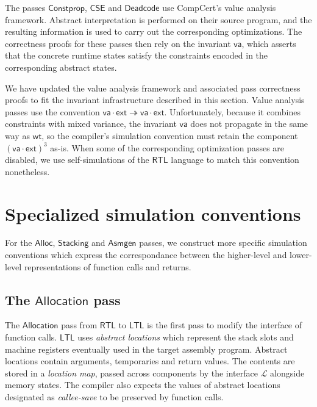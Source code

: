 \documentclass[acmsmall,screen,review,anonymous]{acmart}
\newcommand{\kw}[1]{\ensuremath{ \mathsf{#1} }}
\begin{document}
The passes
$\kw{Constprop}$, $\kw{CSE}$ and $\kw{Deadcode}$
use CompCert's value analysis framework.
Abstract interpretation is performed %
on their source program,
and the resulting information is used to carry out
the corresponding optimizations.
The correctness proofs for these passes then rely
on the invariant $\kw{va}$,
which asserts that the concrete runtime states
satisfy the constraints encoded in the corresponding
abstract states.

We have updated the value analysis framework
and associated pass correctness proofs
to fit the invariant infrastructure described in this section.
Value analysis passes use the convention
$\kw{va} \cdot \kw{ext} \twoheadrightarrow \kw{va} \cdot \kw{ext}$.
Unfortunately,
because it combines constraints with mixed variance,
the invariant $\kw{va}$ does not propagate in the same way as $\kw{wt}$,
so the compiler's simulation convention must retain
the component $(\kw{va} \cdot \kw{ext})^3$ as-is.
When some of the corresponding optimization passes are disabled,
we use self-simulations of the $\kw{RTL}$ language
to match this convention nonetheless.



\section{Specialized simulation conventions} \label{sec:backend} %

For the \kw{Alloc}, \kw{Stacking} and \kw{Asmgen} passes,
we construct more specific simulation conventions
which express the correspondance between
the higher-level and lower-level representations
of function calls and returns.

\subsection{The \kw{Allocation} pass} \label{sec:alloc} %

The \kw{Allocation} pass from \kw{RTL} to \kw{LTL}
is the first pass to modify the interface of function calls.
\kw{LTL} uses \emph{abstract locations}
which represent the stack slots and machine registers
eventually used in the target assembly program.
Abstract locations contain arguments, temporaries and return values.
The contents are stored in a \emph{location map},
passed across components by the interface $\mathcal{L}$
alongside memory states.
The compiler also expects the values of
abstract locations designated as \emph{callee-save}
to be preserved by function calls.
\end{document}
